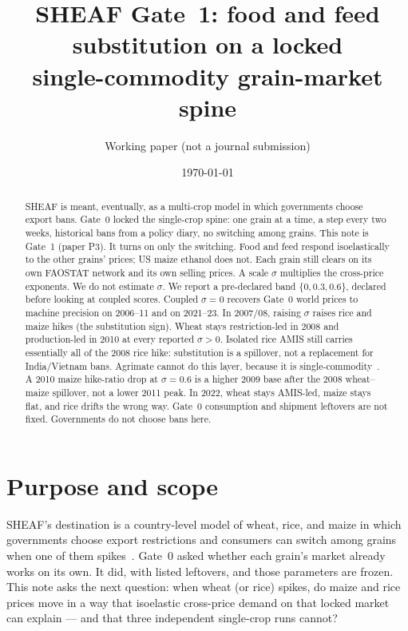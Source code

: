 \documentclass[11pt,a4paper]{article}
\title{SHEAF Gate~1: food and feed substitution on a locked\\
single-commodity grain-market spine}
\author{Working paper (not a journal submission)}
\date{\today}
\begin{document}
\maketitle

\begin{abstract}
SHEAF is meant, eventually, as a multi-crop model in which governments
choose export bans. Gate~0 locked the single-crop spine: one grain at a
time, a step every two weeks, historical bans from a policy diary, no
switching among grains. This note is Gate~1 (paper P3). It turns on only
the switching. Food and feed respond isoelastically to the other grains'
prices; US maize ethanol does not. Each grain still clears on its own
FAOSTAT network and its own selling prices. A scale \(\sigma\) multiplies
the cross-price exponents. We do not estimate \(\sigma\). We report a
pre-declared band \(\{0,0.3,0.6\}\), declared before looking at coupled
scores. Coupled \(\sigma=0\) recovers Gate~0 world prices to machine
precision on 2006--11 and on 2021--23. In 2007/08, raising \(\sigma\)
raises rice and maize hikes (the substitution sign). Wheat stays
restriction-led in 2008 and production-led in 2010 at every reported
\(\sigma>0\). Isolated rice AMIS still carries essentially all of the 2008
rice hike: substitution is a spillover, not a replacement for
India/Vietnam bans. Agrimate cannot do this layer, because it is
single-commodity~\citep{kuhla2025}. A 2010 maize hike-ratio drop at
\(\sigma=0.6\) is a higher 2009 base after the 2008 wheat--maize
spillover, not a lower 2011 peak. In 2022, wheat stays AMIS-led, maize
stays flat, and rice drifts the wrong way. Gate~0 consumption and shipment
leftovers are not fixed. Governments do not choose bans here.
\end{abstract}

\tableofcontents
\vspace{1em}

\section{Purpose and scope}
\label{sec:scope}

SHEAF's destination is a country-level model of wheat, rice, and maize in
which governments choose export restrictions and consumers can switch
among grains when one of them spikes~\citep{kuhla2025,schewe2017}. Gate~0
asked whether each grain's market already works on its own. It did, with
listed leftovers, and those parameters are frozen. This note asks the next
question: when wheat (or rice) spikes, do maize and rice prices move in a
way that isoelastic cross-price demand on that locked market can explain
--- and that three independent single-crop runs cannot?
\end{document}
